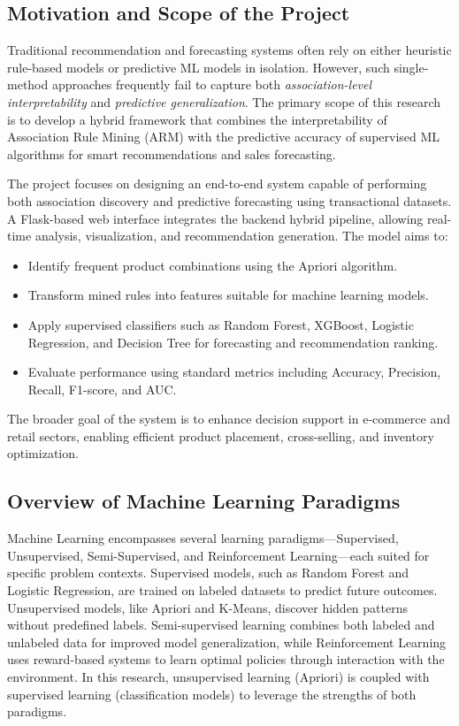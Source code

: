 \documentclass[twocolumn]{article}
\begin{document}
\subsection{Motivation and Scope of the Project}

Traditional recommendation and forecasting systems often rely on either heuristic rule-based models or predictive ML models in isolation. However, such single-method approaches frequently fail to capture both \textit{association-level interpretability} and \textit{predictive generalization}. The primary scope of this research is to develop a hybrid framework that combines the interpretability of Association Rule Mining (ARM) with the predictive accuracy of supervised ML algorithms for smart recommendations and sales forecasting.

The project focuses on designing an end-to-end system capable of performing both association discovery and predictive forecasting using transactional datasets. A Flask-based web interface integrates the backend hybrid pipeline, allowing real-time analysis, visualization, and recommendation generation. The model aims to:
\begin{itemize}
    \item Identify frequent product combinations using the Apriori algorithm.
    \item Transform mined rules into features suitable for machine learning models.
    \item Apply supervised classifiers such as Random Forest, XGBoost, Logistic Regression, and Decision Tree for forecasting and recommendation ranking.
    \item Evaluate performance using standard metrics including Accuracy, Precision, Recall, F1-score, and AUC.
\end{itemize}
The broader goal of the system is to enhance decision support in e-commerce and retail sectors, enabling efficient product placement, cross-selling, and inventory optimization.

\subsection{Overview of Machine Learning Paradigms}

Machine Learning encompasses several learning paradigms—Supervised, Unsupervised, Semi-Supervised, and Reinforcement Learning—each suited for specific problem contexts. Supervised models, such as Random Forest and Logistic Regression, are trained on labeled datasets to predict future outcomes. Unsupervised models, like Apriori and K-Means, discover hidden patterns without predefined labels. Semi-supervised learning combines both labeled and unlabeled data for improved model generalization, while Reinforcement Learning uses reward-based systems to learn optimal policies through interaction with the environment. In this research, unsupervised learning (Apriori) is coupled with supervised learning (classification models) to leverage the strengths of both paradigms.
\end{document}
